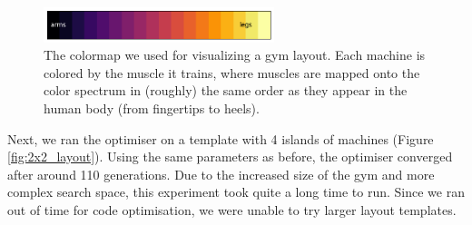 \documentclass[9pt]{pnas-new}
\begin{document}
\begin{figure}[h]
	\centering
	\includegraphics[width=0.6\textwidth]{workoutTypeColormap.png}
	\caption{The colormap we used for visualizing a gym layout. Each machine is colored by the muscle it trains, where muscles are mapped onto the color spectrum in (roughly) the same order as they appear in the human body (from fingertips to heels).}\label{fig:colormap}
\end{figure}

Next, we ran the optimiser on a template with 4 islands of machines (Figure \ref{fig:2x2_layout}). Using the same parameters as before, the optimiser converged after around 110 generations. Due to the increased size of the gym and more complex search space, this experiment took quite a long time to run. Since we ran out of time for code optimisation, we were unable to try larger layout templates.
\end{document}
